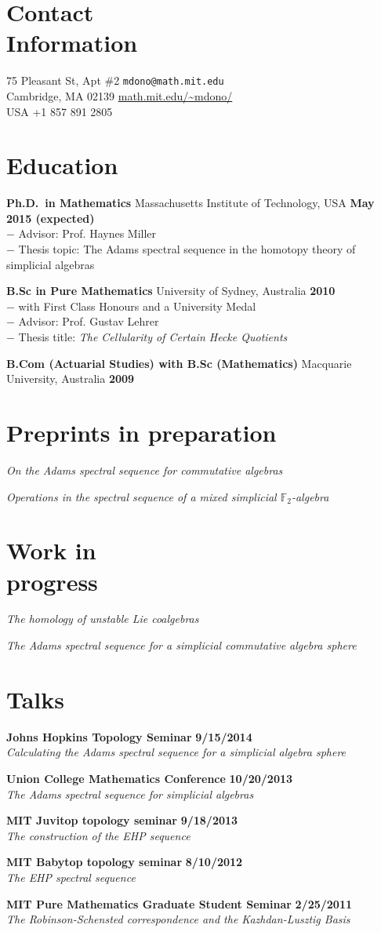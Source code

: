 \documentclass[margin,line]{resume}
\newcommand{\CVsection}[1]{\section{\mysidestyle #1}}
\newcommand{\entry}[3]{\textbf{#1} #2 \hfill \textbf{#3}
           
\vspace{-2.6mm}}
\newcommand{\twolineentry}[4]{\textbf{#1} #2 \hfill \textbf{#4}\\%
#3
           
\vspace{-2.6mm}}
\newcommand{\FINALentry}[3]{\textbf{#1} #2 \hfill \textbf{#3}}
\newcommand{\FINALtwolineentry}[4]{\textbf{#1} #2 \hfill \textbf{#4}\\%
#3}
\begin{document}
\begin{resume}

\CVsection{Contact\\Information}

75 Pleasant St, Apt \#2 \hfill \texttt{mdono@math.mit.edu}\\
Cambridge, MA  02139 \hfill \url{math.mit.edu/~mdono/}\\
USA \hfill +1 857 891 2805





\CVsection{Education}

\twolineentry{Ph.D.\ in Mathematics}{Massachusetts Institute of Technology, USA}{%
\phantom{space}$-$ Advisor: Prof. Haynes Miller\\
\phantom{space}$-$ Thesis topic: The Adams spectral sequence in the homotopy theory of simplicial algebras%
}{May 2015 (expected)}
\twolineentry{B.Sc in Pure Mathematics}{University of Sydney, Australia}{%
\phantom{space}$-$ with First Class Honours and a University Medal\\
\phantom{space}$-$ Advisor: Prof. Gustav Lehrer\\
\phantom{space}$-$ Thesis title: \emph{The Cellularity of Certain Hecke Quotients}
}{2010}
\FINALentry{B.Com (Actuarial Studies) with B.Sc (Mathematics)}{Macquarie University, Australia}{2009}


\CVsection{Preprints in preparation}

\entry{\hspace{-.275em}}{\emph{On the Adams spectral sequence for commutative algebras}}{}
\FINALentry{\hspace{-.275em}}{\emph{Operations in the spectral sequence of a mixed simplicial $\mathbb{F}_2$-algebra}}{}


\CVsection{Work in \\progress}

\entry{\hspace{-.275em}}{\emph{The homology of unstable Lie coalgebras}}{}
\FINALentry{\hspace{-.275em}}{\emph{The Adams spectral sequence for a simplicial commutative algebra
sphere}}{}


\CVsection{Talks}

\twolineentry{Johns Hopkins Topology Seminar}{}{\emph{Calculating the Adams spectral sequence for a simplicial algebra sphere}}{9/15/2014}
\twolineentry{Union College Mathematics Conference}{}{\emph{The Adams spectral sequence for simplicial algebras}}{10/20/2013}
\twolineentry{MIT Juvitop topology seminar}{}{\emph{The construction of the EHP sequence}}{9/18/2013}
\twolineentry{MIT Babytop topology seminar}{}{\emph{The EHP spectral sequence}}{8/10/2012}
\FINALtwolineentry{MIT Pure Mathematics Graduate Student Seminar}{}{\emph{The Robinson-Schensted correspondence and the Kazhdan-Lusztig Basis}}{2/25/2011}



\end{resume}
\end{document}
